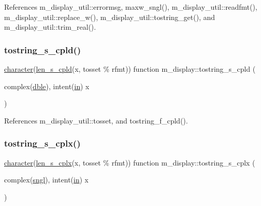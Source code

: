 References m\+\_\+display\+\_\+util\+::errormsg, maxw\+\_\+sngl(), m\+\_\+display\+\_\+util\+::readfmt(), m\+\_\+display\+\_\+util\+::replace\+\_\+w(), m\+\_\+display\+\_\+util\+::tostring\+\_\+get(), and m\+\_\+display\+\_\+util\+::trim\+\_\+real().

\mbox{\label{namespacem__display_ac2a60653468bfb9215fb85b4518363e9}} 
\subsubsection{\texorpdfstring{tostring\+\_\+s\+\_\+cpld()}{tostring\_s\_cpld()}}
{\footnotesize\ttfamily \hyperlink{option__stopwatch_83_8txt_abd4b21fbbd175834027b5224bfe97e66}{character}(\hyperlink{namespacem__display_ace35690c2f36e28f07336cc7dcff47f4}{len\+\_\+s\+\_\+cpld}(x, tosset \% rfmt)) function m\+\_\+display\+::tostring\+\_\+s\+\_\+cpld (\begin{DoxyParamCaption}\item[{complex(\hyperlink{namespacem__display_a46d90b75b6ccef7ccade133e5847e815}{dble}), intent(\hyperlink{M__journal_83_8txt_afce72651d1eed785a2132bee863b2f38}{in})}]{x }\end{DoxyParamCaption})\hspace{0.3cm}{\ttfamily [private]}}



References m\+\_\+display\+\_\+util\+::tosset, and tostring\+\_\+f\+\_\+cpld().

\mbox{\label{namespacem__display_ab2141edcb1746f1aa92e31ed07d597a8}} 
\subsubsection{\texorpdfstring{tostring\+\_\+s\+\_\+cplx()}{tostring\_s\_cplx()}}
{\footnotesize\ttfamily \hyperlink{option__stopwatch_83_8txt_abd4b21fbbd175834027b5224bfe97e66}{character}(\hyperlink{namespacem__display_a7b573fb0cba7c7c954a820cdfe1c7968}{len\+\_\+s\+\_\+cplx}(x, tosset \% rfmt)) function m\+\_\+display\+::tostring\+\_\+s\+\_\+cplx (\begin{DoxyParamCaption}\item[{complex(\hyperlink{namespacem__display_a2ac86bc535c3ccc5947dbb3109c666b5}{sngl}), intent(\hyperlink{M__journal_83_8txt_afce72651d1eed785a2132bee863b2f38}{in})}]{x }\end{DoxyParamCaption})\hspace{0.3cm}{\ttfamily [private]}}



